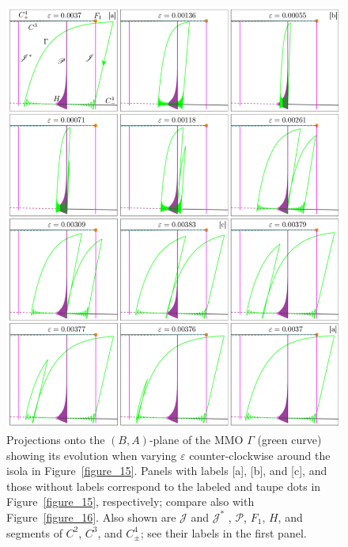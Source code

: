 \documentclass{ws-ijbc}
\begin{document}
\begin{figure}[t!]
\centering
\includegraphics[width=17.4cm]{./figures/MKMO_17_scan.png}
\caption{Projections onto the $(B,A)$-plane of the MMO $\Gamma$ (green curve) showing its evolution when varying $\varepsilon$ counter-clockwise around the isola in Figure~\ref{figure_15}.  Panels with labels [a], [b], and [c], and those without labels correspond to the labeled and taupe dots in Figure~\ref{figure_15}, respectively; compare also with Figure~\ref{figure_16}.  Also shown are $\mathscr{J}$ and $\mathscr{J}^*$ , $\mathscr{P}$, $F_1$, $H$, and segments of $C^2$, $C^3$, and $C^4_\pm$; see their labels in the first panel.}
\label{figure_17}
\end{figure}
\end{document}
